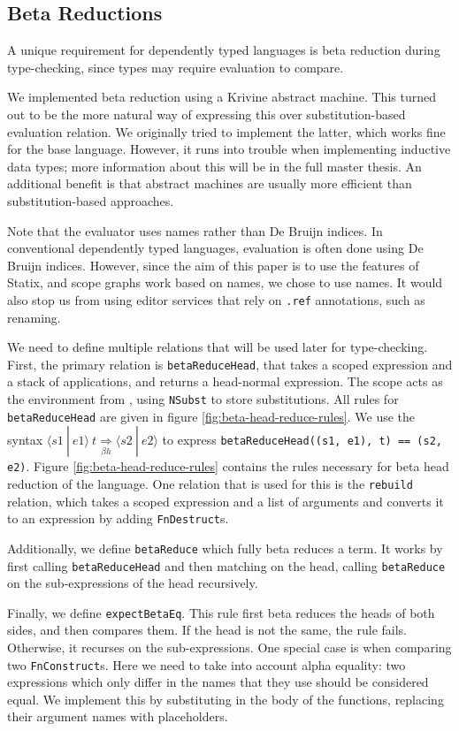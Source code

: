 \documentclass[a4paper,UKenglish,cleveref, autoref, thm-restate]{oasics-v2021}
\newcommand{\scope}[2]{\langle#1 \: | \: #2\rangle}
\newcommand{\bhr}[3]{ #1 \: #2 \underset{\beta h}{\Rightarrow} #3 }
\begin{document}
\subsection{Beta Reductions}
\label{sec:coc-dynsyms}

A unique requirement for dependently typed languages is beta reduction during type-checking, since types may require evaluation to compare.

We implemented beta reduction using a Krivine abstract machine\cite{krivine}. This turned out to be the more natural way of expressing this over substitution-based evaluation relation. We originally tried to implement the latter, which works fine for the base language. However, it runs into trouble when implementing inductive data types; more information about this will be in the full master thesis. An additional benefit is that abstract machines are usually more efficient than substitution-based approaches.

Note that the evaluator uses names rather than De Bruijn indices. In conventional dependently typed languages, evaluation is often done using De Bruijn indices. However, since the aim of this paper is to use the features of Statix, and scope graphs work based on names, we chose to use names. It would also stop us from using editor services that rely on \verb|.ref| annotations, such as renaming.

We need to define multiple relations that will be used later for type-checking. First, the primary relation is \verb|betaReduceHead|, that takes a scoped expression and a stack of applications, and returns a head-normal expression. The scope acts as the environment from \cite{krivine}, using \verb|NSubst| to store substitutions. All rules for \verb|betaReduceHead| are given in figure \ref{fig:beta-head-reduce-rules}. We use the syntax $\bhr{\scope{s1}{e1}}{t}{\scope{s2}{e2}}$ to express \verb|betaReduceHead((s1, e1), t) == (s2, e2)|. Figure \ref{fig:beta-head-reduce-rules} contains the rules necessary for beta head reduction of the language. One relation that is used for this is the \verb|rebuild| relation, which takes a scoped expression and a list of arguments and converts it to an expression by adding \verb|FnDestruct|s.

Additionally, we define \verb|betaReduce| which fully beta reduces a term. It works by first calling \verb|betaReduceHead| and then matching on the head, calling \verb|betaReduce| on the sub-expressions of the head recursively.

Finally, we define \verb|expectBetaEq|. This rule first beta reduces the heads of both sides, and then compares them. If the head is not the same, the rule fails. Otherwise, it recurses on the sub-expressions. One special case is when comparing two \verb|FnConstruct|s. Here we need to take into account alpha equality: two expressions which only differ in the names that they use should be considered equal. We implement this by substituting in the body of the functions, replacing their argument names with placeholders. 
\end{document}
